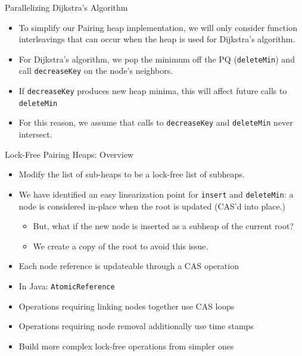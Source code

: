 \documentclass{beamer}
\begin{document}
\begin{frame}{Parallelizing Dijkstra's Algorithm}
  \begin{itemize}
  \item To simplify our Pairing heap implementation, we will only
    consider function interleavings that can occur when the heap is used
    for Dijkstra's algorithm.
  \item For Dijkstra's algorithm, we pop the minimum off the PQ (\texttt{deleteMin})
    and call \texttt{decreaseKey} on the node's neighbors.
  \item If \texttt{decreaseKey} produces new heap minima, this will affect
    future calls to \texttt{deleteMin}
  \item For this reason, we assume that calls to \texttt{decreaseKey} and \texttt{deleteMin}
    never intersect.
  \end{itemize}
\end{frame}

\begin{frame}{Lock-Free Pairing Heaps: Overview}
  \begin{itemize}
    \item Modify the list of sub-heaps to be a lock-free list of subheaps.
    \item We have identified an easy linearization point for \texttt{insert} and \texttt{deleteMin}:
      a node is considered in-place when the root is updated (CAS'd into place.)
      \begin{itemize}
        \item But, what if the new node is inserted as a subheap of the current root?
        \item We create a copy of the root to avoid this issue.
      \end{itemize}
    \item Each node reference is updateable through a CAS operation
    \item In Java: \texttt{AtomicReference}
    \item Operations requiring linking nodes together use CAS loops
    \item Operations requiring node removal additionally use time stamps
    \item Build more complex lock-free operations from simpler ones
  \end{itemize}
\end{frame}
\end{document}
